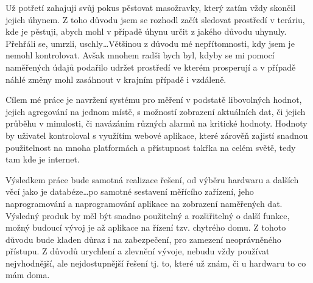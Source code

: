 Už potřetí zahajuji svůj pokus pěstovat masožravky, který zatím vždy skončil jejich úhynem. Z toho důvodu jsem se 
rozhodl začít sledovat prostředí v teráriu, kde je pěstuji, abych mohl v případě úhynu určit z jakého důvodu uhynuly. 
Přehřáli se, umrzli, uschly\ldots Většinou z důvodu mé nepřítomnosti, kdy jsem je nemohl kontrolovat. Avšak mnohem radši 
bych byl, kdyby se mi pomocí naměřených údajů podařilo udržet prostředí ve kterém prosperují a v případě náhlé změny 
mohl zasáhnout v krajním případě i vzdáleně.

Cílem mé práce je navržení systému pro měření v podstatě libovolných hodnot, jejich agregování na jednom místě, 
s možností zobrazení aktuálních dat, či jejich průběhu v minulosti, či navázáním různých alarmů na kritické hodnoty. 
Hodnoty by uživatel kontroloval s využítím webové aplikace, které zárověň zajistí snadnou použitelnost na mnoha 
platformách a přístupnost takřka na celém světě, tedy tam kde je internet.

Výsledkem práce bude samotná realizace řešení, od výběru hardwaru a dalších věcí jako je databéze\ldots po samotné 
sestavení měřícího zařízení, jeho naprogramování a naprogramování aplikace na zobrazení naměřených dat. Výsledný produk 
by měl být snadno použitelný a rozšiřitelný o další funkce, možný budoucí vývoj je až aplikace na řízení tzv. chytrého 
domu. Z tohoto důvodu bude kladen důraz i na zabezpečení, pro zamezení neoprávněného přístupu. Z důvodů urychlení 
a zlevnění vývoje, nebudu vždy používat nejvhodnější, ale nejdostupnější řešení tj. to, které už znám, či u hardwaru to 
co mám doma.
